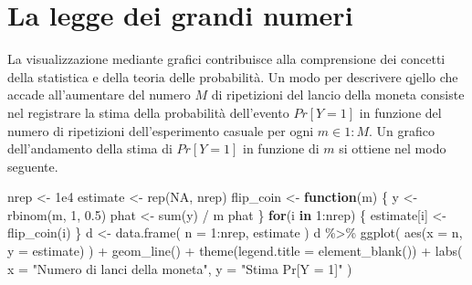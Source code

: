 \documentclass[
  11pt,
]{krantz}
\makeatletter
\newenvironment{Shaded}{\begin{snugshade}}{\end{snugshade}}
\newcommand{\AttributeTok}[1]{\textcolor[rgb]{0.61,0.61,0.61}{#1}}
\newcommand{\ConstantTok}[1]{\textcolor[rgb]{0,0,0}{#1}}
\newcommand{\ControlFlowTok}[1]{\textcolor[rgb]{0.27,0.27,0.27}{\textbf{#1}}}
\newcommand{\DecValTok}[1]{\textcolor[rgb]{0.06,0.06,0.06}{#1}}
\newcommand{\FloatTok}[1]{\textcolor[rgb]{0.06,0.06,0.06}{#1}}
\newcommand{\FunctionTok}[1]{\textcolor[rgb]{0,0,0}{#1}}
\newcommand{\NormalTok}[1]{#1}
\newcommand{\OtherTok}[1]{\textcolor[rgb]{0.37,0.37,0.37}{#1}}
\newcommand{\SpecialCharTok}[1]{\textcolor[rgb]{0,0,0}{#1}}
\newcommand{\StringTok}[1]{\textcolor[rgb]{0.5,0.5,0.5}{#1}}
\newenvironment{kframe}{%
\medskip{}
\setlength{\fboxsep}{.8em}
 \def\at@end@of@kframe{}%
 \ifinner\ifhmode%
  \def\at@end@of@kframe{\end{minipage}}%
  \begin{minipage}{\columnwidth}%
 \fi\fi%
 \def\FrameCommand##1{\hskip\@totalleftmargin \hskip-\fboxsep
 \colorbox{shadecolor}{##1}\hskip-\fboxsep
     \hskip-\linewidth \hskip-\@totalleftmargin \hskip\columnwidth}%
 \MakeFramed {\advance\hsize-\width
   \@totalleftmargin\z@ \linewidth\hsize
   \@setminipage}}%
 {\par\unskip\endMakeFramed%
 \at@end@of@kframe}
\renewenvironment{Shaded}{\begin{kframe}}{\end{kframe}}
\theoremstyle{definition}
\theoremstyle{definition}
\theoremstyle{definition}
\theoremstyle{definition}
\theoremstyle{remark}
\makeatother
\begin{document}
\hypertarget{la-legge-dei-grandi-numeri}{%
\section{La legge dei grandi numeri}\label{la-legge-dei-grandi-numeri}}

La visualizzazione mediante grafici contribuisce alla comprensione dei concetti della statistica e della teoria delle probabilità. Un modo per descrivere qjello che accade all'aumentare del numero \(M\) di ripetizioni del lancio della moneta consiste nel registrare la stima della probabilità dell'evento \(Pr[Y = 1]\) in funzione del numero di ripetizioni dell'esperimento casuale per ogni \(m \in 1:M.\) Un grafico dell'andamento della stima di \(Pr[Y = 1]\) in funzione di \(m\) si ottiene nel modo seguente.

\begin{Shaded}
\begin{Highlighting}[]
\NormalTok{nrep }\OtherTok{\textless{}{-}} \FloatTok{1e4}
\NormalTok{estimate }\OtherTok{\textless{}{-}} \FunctionTok{rep}\NormalTok{(}\ConstantTok{NA}\NormalTok{, nrep)}
\NormalTok{flip\_coin }\OtherTok{\textless{}{-}} \ControlFlowTok{function}\NormalTok{(m) \{}
\NormalTok{  y }\OtherTok{\textless{}{-}} \FunctionTok{rbinom}\NormalTok{(m, }\DecValTok{1}\NormalTok{, }\FloatTok{0.5}\NormalTok{)}
\NormalTok{  phat }\OtherTok{\textless{}{-}} \FunctionTok{sum}\NormalTok{(y) }\SpecialCharTok{/}\NormalTok{ m}
\NormalTok{  phat}
\NormalTok{\}}
\ControlFlowTok{for}\NormalTok{(i }\ControlFlowTok{in} \DecValTok{1}\SpecialCharTok{:}\NormalTok{nrep) \{}
\NormalTok{  estimate[i] }\OtherTok{\textless{}{-}} \FunctionTok{flip\_coin}\NormalTok{(i)}
\NormalTok{\}}
\NormalTok{d }\OtherTok{\textless{}{-}} \FunctionTok{data.frame}\NormalTok{(}
  \AttributeTok{n =} \DecValTok{1}\SpecialCharTok{:}\NormalTok{nrep, }
\NormalTok{  estimate}
\NormalTok{)}
\NormalTok{d }\SpecialCharTok{\%\textgreater{}\%} 
  \FunctionTok{ggplot}\NormalTok{(}
    \FunctionTok{aes}\NormalTok{(}\AttributeTok{x =}\NormalTok{ n, }\AttributeTok{y =}\NormalTok{ estimate)}
\NormalTok{  ) }\SpecialCharTok{+}
  \FunctionTok{geom\_line}\NormalTok{() }\SpecialCharTok{+}
  \FunctionTok{theme}\NormalTok{(}\AttributeTok{legend.title =} \FunctionTok{element\_blank}\NormalTok{()) }\SpecialCharTok{+}
  \FunctionTok{labs}\NormalTok{(}
    \AttributeTok{x =} \StringTok{"Numero di lanci della moneta"}\NormalTok{, }
    \AttributeTok{y =} \StringTok{"Stima Pr[Y = 1]"}
\NormalTok{)}
\end{Highlighting}
\end{Shaded}
\end{document}
